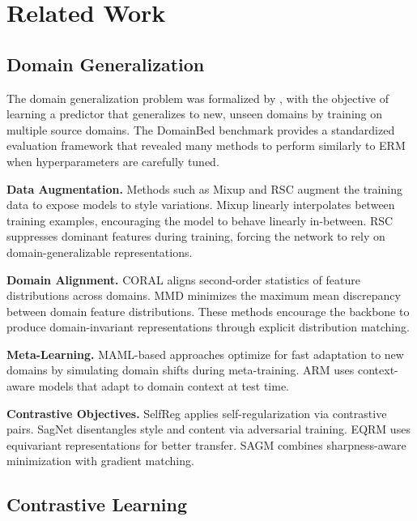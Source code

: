 \documentclass[12pt,a4paper]{article}
\begin{document}
\section{Related Work}
\label{sec:related}

\subsection{Domain Generalization}

The domain generalization problem was formalized by \citealt{blanchard2011}, with the
objective of learning a predictor that generalizes to new, unseen domains by training on
multiple source domains. The DomainBed benchmark \citep{gulrajani2021} provides a
standardized evaluation framework that revealed many methods to perform similarly to ERM
when hyperparameters are carefully tuned.

\textbf{Data Augmentation.} Methods such as Mixup \citep{zhang2018} and RSC \citep{huang2020}
augment the training data to expose models to style variations. Mixup linearly interpolates
between training examples, encouraging the model to behave linearly in-between.
RSC suppresses dominant features during training, forcing the network to rely on
domain-generalizable representations.

\textbf{Domain Alignment.} CORAL \citep{sun2016} aligns second-order statistics of feature
distributions across domains. MMD \citep{gretton2012} minimizes the maximum mean discrepancy
between domain feature distributions. These methods encourage the backbone to produce
domain-invariant representations through explicit distribution matching.

\textbf{Meta-Learning.} MAML-based approaches optimize for fast adaptation to new domains
by simulating domain shifts during meta-training. ARM \citep{zhang2021} uses context-aware
models that adapt to domain context at test time.

\textbf{Contrastive Objectives.} SelfReg \citep{kim2021} applies self-regularization via
contrastive pairs. SagNet \citep{nam2021} disentangles style and content via adversarial
training. EQRM \citep{eastwood2022} uses equivariant representations for better transfer.
SAGM \citep{wang2023} combines sharpness-aware minimization with gradient matching.

\subsection{Contrastive Learning}
\end{document}
